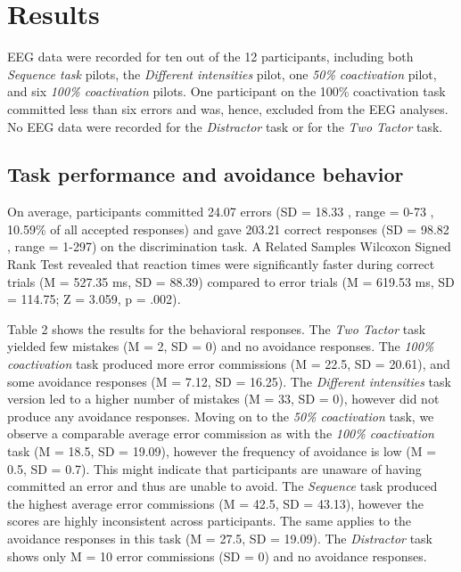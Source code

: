 \documentclass[twocolumn, serif, authordate, review]{jote-article}
\begin{document}
{}
\section*{Results} 
\gotoreview
\label{sec:results}

\noindent EEG data were recorded for ten out of the 12 participants, including both \textit{Sequence task }pilots, the \textit{Different intensities }pilot, one \textit{50\% coactivation} pilot, and six \textit{100\% coactivation} pilots. One participant on the 100\% coactivation task committed less than six errors and was, hence, excluded from the EEG analyses. No EEG data were recorded for the \textit{Distractor }task or for the \textit{Two Tactor }task. 

{}
\subsection*{Task performance and avoidance behavior}
\gotoreview
\label{sec:taskperformance}

\noindent On average, participants committed 24.07 errors (SD = 18.33 , range = 0-73 , 10.59\% of all accepted responses) and gave 203.21 correct responses (SD = 98.82 , range = 1-297) on the discrimination task. A Related Samples Wilcoxon Signed Rank Test revealed that reaction times were significantly faster during correct trials (M = 527.35 ms, SD = 88.39) compared to error trials (M = 619.53 ms, SD = 114.75; Z = 3.059, p = .002)\textit{.}

Table 2 shows the results for the behavioral responses. The \textit{Two Tactor }task yielded few mistakes (M = 2, SD = 0) and no avoidance responses. The \textit{100\% coactivation }task produced more error commissions (M = 22.5, SD = 20.61), and some avoidance responses (M = 7.12, SD = 16.25). The \textit{Different intensities} task version led to a higher number of mistakes (M = 33, SD = 0), however did not produce any avoidance responses. Moving on to the \textit{50\% coactivation }task, we observe a comparable average error commission as with the \textit{100\% coactivation} task (M = 18.5, SD = 19.09), however the frequency of avoidance is low (M = 0.5, SD = 0.7). This might indicate that participants are unaware of having committed an error and thus are unable to avoid. The \textit{Sequence }task produced the highest average error commissions (M = 42.5, SD = 43.13), however the scores are highly inconsistent across participants. The same applies to the avoidance responses in this task (M = 27.5, SD = 19.09). The \textit{Distractor }task shows only M = 10 error commissions (SD = 0) and no avoidance responses.~
\end{document}

